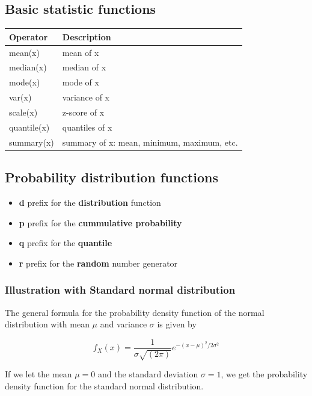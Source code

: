 \documentclass[]{book}
\begin{document}
\hypertarget{basic-statistic-functions}{%
\subsection{Basic statistic functions}\label{basic-statistic-functions}}

\begin{longtable}[]{@{}ll@{}}
\toprule
Operator & Description\tabularnewline
\midrule
\endhead
mean(x) & mean of x\tabularnewline
median(x) & median of x\tabularnewline
mode(x) & mode of x\tabularnewline
var(x) & variance of x\tabularnewline
scale(x) & z-score of x\tabularnewline
quantile(x) & quantiles of x\tabularnewline
summary(x) & summary of x: mean, minimum, maximum, etc.\tabularnewline
\bottomrule
\end{longtable}

\hypertarget{probability-distribution-functions}{%
\subsection{Probability distribution functions}\label{probability-distribution-functions}}

\begin{itemize}
\item
  \textbf{d} prefix for the \textbf{distribution} function
\item
  \textbf{p} prefix for the \textbf{cummulative probability}
\item
  \textbf{q} prefix for the \textbf{quantile}
\item
  \textbf{r} prefix for the \textbf{random} number generator
\end{itemize}

\hypertarget{illustration-with-standard-normal-distribution}{%
\subsubsection{Illustration with Standard normal distribution}\label{illustration-with-standard-normal-distribution}}

The general formula for the probability density function of the normal distribution with mean \(\mu\) and variance \(\sigma\) is given by

\[
f_X(x) = \frac{1}{\sigma\sqrt{(2\pi)}} e^{-(x-\mu)^2/2\sigma^2}
\]

If we let the mean \(\mu=0\) and the standard deviation \(\sigma=1\), we get the probability density function for the standard normal distribution.
\end{document}
